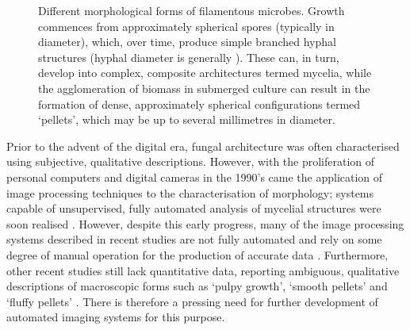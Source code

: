 \begin{figure}[htbp]
	\hspace{1cm}
	\caption{Different morphological forms of filamentous microbes. Growth commences from approximately spherical spores (typically  in diameter), which, over time, produce simple branched hyphal structures (hyphal diameter is generally ). These can, in turn, develop into complex, composite architectures termed mycelia, while the agglomeration of biomass in submerged culture can result in the formation of dense, approximately spherical configurations termed \lq pellets', which may be up to several millimetres in diameter.}
	\label{fig:LifeCycle}
\end{figure}

Prior to the advent of the digital era, fungal architecture was often characterised using subjective, qualitative descriptions. However, with the proliferation of personal computers and digital cameras in the 1990's came the application of image processing techniques to the characterisation of morphology; systems capable of unsupervised, fully automated analysis of mycelial structures were soon realised \cite{packer1990,tucker1992}. However, despite this early progress, many of the image processing systems described in recent studies are not fully automated and rely on some degree of manual operation for the production of accurate data \cite{lecault2007,elsabbagh2008,anikster2005,lubbehusen2004}. Furthermore, other recent studies still lack quantitative data, reporting ambiguous, qualitative descriptions of macroscopic forms such as \lq pulpy growth', \lq smooth pellets' and \lq fluffy pellets' \cite{domingues2000,znidarsic2000}. There is therefore a pressing need for further development of automated imaging systems for this purpose.